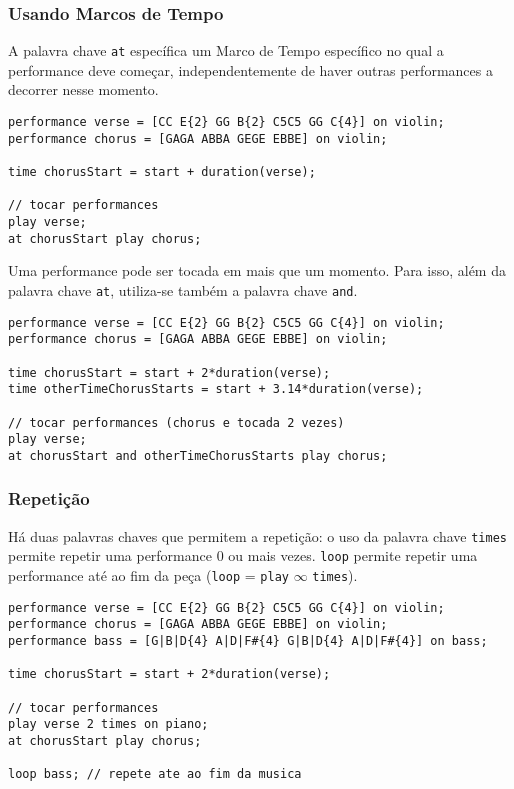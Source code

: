 \documentclass{article}
\begin{document}

\subsubsection{Usando Marcos de Tempo}
A palavra chave \texttt{at} específica um Marco de Tempo específico no qual a performance deve começar, independentemente de haver outras performances a decorrer nesse momento. 
\begin{lstlisting} 
performance verse = [CC E{2} GG B{2} C5C5 GG C{4}] on violin;
performance chorus = [GAGA ABBA GEGE EBBE] on violin;

time chorusStart = start + duration(verse);

// tocar performances
play verse;
at chorusStart play chorus;
\end{lstlisting}

Uma performance pode ser tocada em mais que um momento. Para isso, além da palavra chave \texttt{at}, utiliza-se também a palavra chave  \texttt{and}.
\begin{lstlisting} 
performance verse = [CC E{2} GG B{2} C5C5 GG C{4}] on violin;
performance chorus = [GAGA ABBA GEGE EBBE] on violin;

time chorusStart = start + 2*duration(verse);
time otherTimeChorusStarts = start + 3.14*duration(verse);

// tocar performances (chorus e tocada 2 vezes)
play verse;
at chorusStart and otherTimeChorusStarts play chorus;
\end{lstlisting}

\subsubsection{Repetição}
Há duas palavras chaves que permitem a repetição: o uso da palavra chave \texttt{times} permite repetir uma performance 0 ou mais vezes. \texttt{loop} permite repetir uma performance até ao fim da peça  (\texttt{loop} = \texttt{play} $\infty$ \texttt{times}).
\begin{lstlisting} 
performance verse = [CC E{2} GG B{2} C5C5 GG C{4}] on violin;
performance chorus = [GAGA ABBA GEGE EBBE] on violin;
performance bass = [G|B|D{4} A|D|F#{4} G|B|D{4} A|D|F#{4}] on bass;

time chorusStart = start + 2*duration(verse);

// tocar performances
play verse 2 times on piano;
at chorusStart play chorus;

loop bass; // repete ate ao fim da musica
\end{lstlisting}
\end{document}
